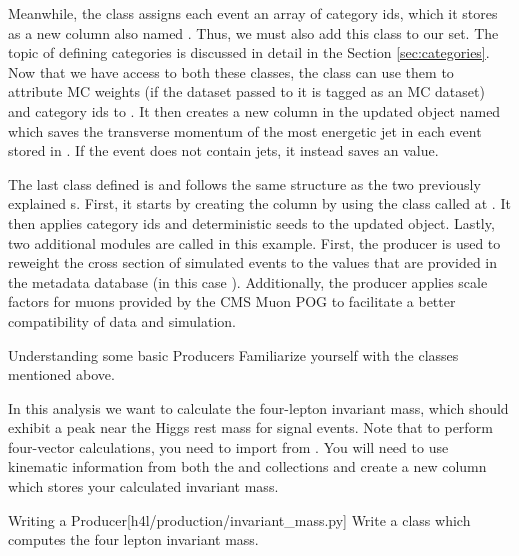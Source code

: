 Meanwhile, the  class assigns each event an array of category ids, which it stores as a new column also named . Thus, we must also add this class to our  set. The topic of defining categories is discussed in detail in the Section \ref{sec:categories}. Now that we have access to both these  classes, the  class can use them to attribute MC weights (if the dataset passed to it is tagged as an MC dataset) and category ids to . It then creates a new column in the updated  object named  which saves the transverse momentum of the most energetic jet in each event stored in . If the event does not contain jets, it instead saves an  value.

The last  class defined is  and follows the same structure as the  two previously explained s.
First, it starts by creating the  column by using the  class  called at .
It then applies category ids and deterministic seeds to the updated  object.
Lastly, two additional modules are called in this example.
First, the  producer is used to reweight the cross section of simulated events to the values that are provided in the metadata database (in this case ).
Additionally, the  producer applies scale factors for muons provided by the CMS Muon POG to facilitate a better compatibility of data and simulation.

\begin{exercise}{Understanding some basic Producers}
	Familiarize yourself with the  classes mentioned above.
\end{exercise}

In this  analysis we want to calculate the four-lepton invariant mass, which should exhibit a peak near the Higgs rest mass for signal events.
Note that to perform four-vector calculations, you need to import  from .
You will need to use kinematic information from both the  and  collections and create a new column which stores your calculated invariant mass.

\begin{exercise}{Writing a Producer}[h4l/production/invariant\_mass.py]
	Write a  class which computes the four lepton invariant mass.
\end{exercise}
